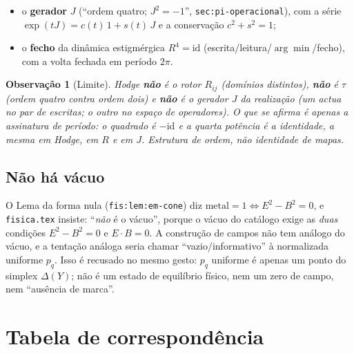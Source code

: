 \documentclass[11pt,a4paper]{article}
\newtheorem{observacao}{Observação}
\begin{document}
\begin{itemize}[leftmargin=1.5em]
\item o \textbf{gerador} $J$ (``ordem quatro; $J^{2}=-1$'',
      \texttt{sec:pi-operacional}), com a série $\exp(tJ)=c(t)\,1+s(t)\,J$ e a
      conservação $c^{2}+s^{2}=1$;
\item o \textbf{fecho} da dinâmica estigmérgica $R^{4}=\mathrm{id}$
      (escrita/leitura/$\arg\min$/fecho), com a volta fechada em período $2\pi$.
\end{itemize}

\begin{observacao}[Limite]
\label{obs:limite-hodge}
Hodge \textbf{não} é o rotor $R_{ij}$ (domínios distintos), \textbf{não} é
$\tau$ (ordem quatro contra ordem dois) e \textbf{não} é o gerador $J$ da
realização (um actua no par de escritas; o outro no espaço de operadores). O
que se afirma é apenas \emph{a assinatura de período}: o quadrado é $-\mathrm{id}$
e a quarta potência é a identidade, a mesma em Hodge, em $R$ e em $J$. Estrutura
de ordem, não identidade de mapas.
\end{observacao}

\subsection{Não há vácuo}

O Lema da forma nula (\texttt{fis:lem:em-cone}) diz $\text{metal}=1\iff E^{2}-B^{2}=0$,
e \texttt{fisica.tex} insiste: ``\emph{não} é o vácuo'', porque o vácuo do
catálogo exige as \emph{duas} condições $E^{2}-B^{2}=0$ e $E\cdot B=0$. A
construção de campos não tem análogo do vácuo, e a tentação análoga seria
chamar ``vazio/informativo'' à normalizada uniforme $p_q$. Isso é recusado no
mesmo gesto: $p_q$ uniforme é apenas um ponto do simplex $\Delta(Y)$; não é um
estado de equilíbrio físico, nem um zero de campo, nem ``ausência de marca''.

\begin{center}
\end{center}

\section{Tabela de correspondência}\label{sec:tabela}
\end{document}

